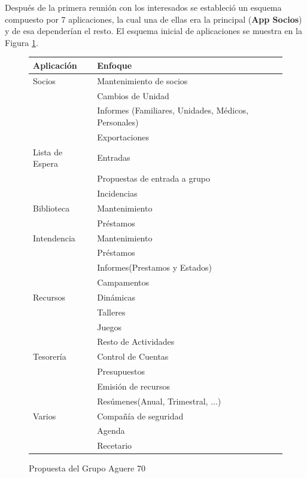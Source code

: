 Después de la primera reunión con los interesados se estableció un esquema compuesto por 7 aplicaciones,
la cual una de ellas era la principal (\textbf{App Socios}) y de esa dependerían el resto. El esquema inicial de aplicaciones se muestra en la Figura \ref{fig:aplicaciones}.\\

\begin{figure}[H]
\begin{center}
\begin{tabular}{|p{30mm}|p{90mm}|} \hline 
\textbf{Aplicación} & \textbf{Enfoque} \\ \hline
Socios &
Mantenimiento de socios\\
& Cambios de Unidad\\
& Informes (Familiares, Unidades, Médicos, Personales)\\
& Exportaciones
\\
\hline

Lista de Espera &
Entradas \\
& Propuestas de entrada a grupo \\
& Incidencias
\\
\hline

Biblioteca &
Mantenimiento \\
& Préstamos
\\
\hline

Intendencia &
Mantenimiento \\
& Préstamos \\
& Informes(Prestamos y Estados) \\
& Campamentos
\\
\hline

Recursos &
Dinámicas \\
& Talleres \\
& Juegos \\
& Resto de Actividades
\\
\hline

Tesorería &
Control de Cuentas \\
& Presupuestos \\
& Emisión de recursos \\
& Resúmenes(Anual, Trimestral, ...)
\\
\hline

Varios &
Compañía de seguridad \\
& Agenda \\
& Recetario
\\
\hline

\end{tabular}
\caption{Propuesta del Grupo Aguere 70}
\label{fig:aplicaciones}
\end{center}
\end{figure}



